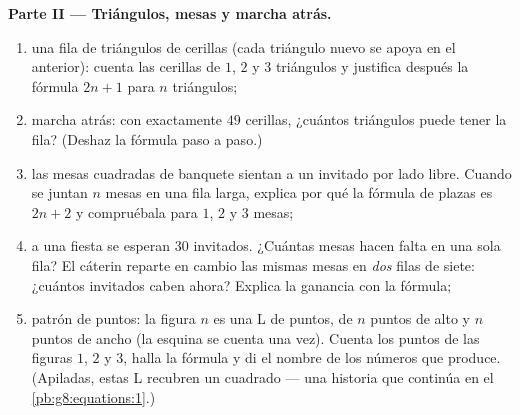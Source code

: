 \begin{problem}
\medskip
\noindent\textbf{Parte II --- Triángulos, mesas y marcha
atrás.}
\begin{enumerate}[resume]
  \item una fila de triángulos de cerillas (cada triángulo nuevo se apoya en
        el anterior): cuenta las cerillas de $1$, $2$ y $3$
        triángulos y justifica después la fórmula $2n + 1$ para $n$
        triángulos;
  \item marcha atrás: con exactamente $49$ cerillas, ¿cuántos
        triángulos puede tener la fila? (Deshaz la fórmula paso a
        paso.)
  \item las mesas cuadradas de banquete sientan a un invitado por lado libre. Cuando
        se juntan $n$ mesas en una fila larga, explica por qué
        la fórmula de plazas es $2n + 2$ y compruébala para $1$, $2$ y
        $3$ mesas;
  \item a una fiesta se esperan $30$ invitados. ¿Cuántas mesas hacen falta
        en una sola fila? El cáterin reparte en cambio las mismas mesas en
        \emph{dos} filas de siete: ¿cuántos invitados caben ahora?
        Explica la ganancia con la fórmula;
  \item patrón de puntos: la figura $n$ es una L de puntos, de $n$ puntos de alto
        y $n$ puntos de ancho (la esquina se cuenta una vez). Cuenta los
        puntos de las figuras $1$, $2$ y $3$, halla la fórmula y di el nombre
        de los números que produce. (Apiladas, estas L recubren
        un cuadrado --- una historia que continúa en el
        \cref{pb:g8:equations:1}.)
\end{enumerate}


\end{problem}
